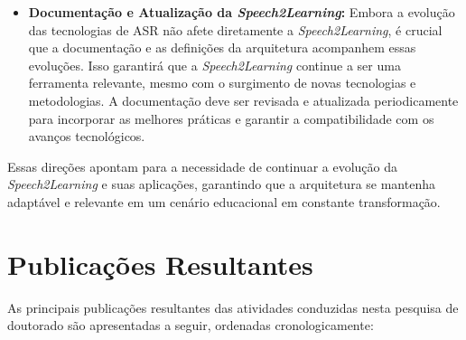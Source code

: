 \begin{itemize}
    \item \textbf{Documentação e Atualização da \textit{Speech2Learning}:} Embora a evolução das tecnologias de ASR não afete diretamente a \textit{Speech2Learning}, é crucial que a documentação e as definições da arquitetura acompanhem essas evoluções. Isso garantirá que a \textit{Speech2Learning} continue a ser uma ferramenta relevante, mesmo com o surgimento de novas tecnologias e metodologias. A documentação deve ser revisada e atualizada periodicamente para incorporar as melhores práticas e garantir a compatibilidade com os avanços tecnológicos.

\end{itemize}

Essas direções apontam para a necessidade de continuar a evolução da \textit{Speech2Learning} e suas aplicações, garantindo que a arquitetura se mantenha adaptável e relevante em um cenário educacional em constante transformação.

\section{Publicações Resultantes}

As principais publicações resultantes das atividades conduzidas nesta pesquisa de doutorado são apresentadas a seguir, ordenadas cronologicamente:

